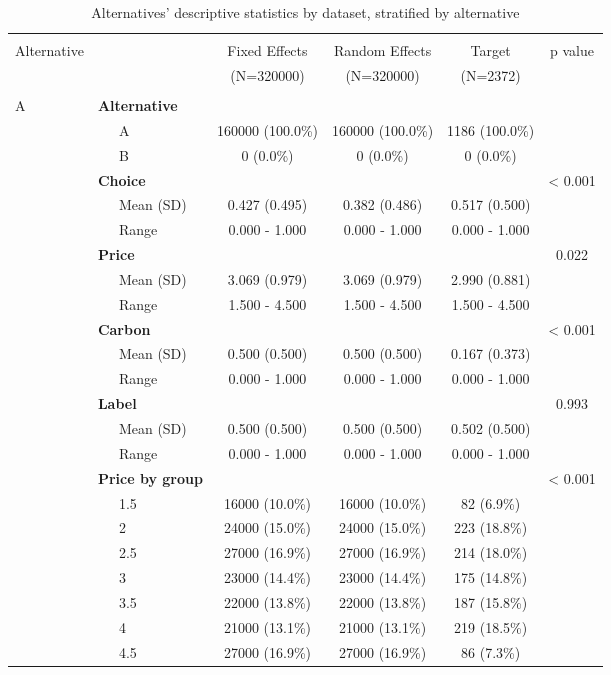 \documentclass[11pt,]{article}
\begin{document}
\begin{table}[!htbp] \centering 
  \caption{Alternatives' descriptive statistics by dataset, stratified by alternative} 
  \label{tab:stratA} 
\begin{tabular}{@{\extracolsep{5pt}}llcccc}
\\[-1.8ex]\hline 
\hline \\[-1.8ex] 
Alternative &  & Fixed Effects  & Random Effects  & Target  & p value\\
 & & (N=320000) & (N=320000) & (N=2372) &  \\
\hline \\[-1.8ex] 
A & \textbf{Alternative} &  &  &  & \\
 & ~~~A & 160000 (100.0\%) & 160000 (100.0\%) & 1186 (100.0\%) & \\
 & ~~~B & 0 (0.0\%) & 0 (0.0\%) & 0 (0.0\%) & \\
 & \textbf{Choice} &  &  &  & < 0.001\\
 & ~~~Mean (SD) & 0.427 (0.495) & 0.382 (0.486) & 0.517 (0.500) & \\
 & ~~~Range & 0.000 - 1.000 & 0.000 - 1.000 & 0.000 - 1.000 & \\
 & \textbf{Price} &  &  &  & 0.022\\
 & ~~~Mean (SD) & 3.069 (0.979) & 3.069 (0.979) & 2.990 (0.881) & \\
 & ~~~Range & 1.500 - 4.500 & 1.500 - 4.500 & 1.500 - 4.500 & \\
 & \textbf{Carbon} &  &  &  & < 0.001\\
 & ~~~Mean (SD) & 0.500 (0.500) & 0.500 (0.500) & 0.167 (0.373) & \\
 & ~~~Range & 0.000 - 1.000 & 0.000 - 1.000 & 0.000 - 1.000 & \\
 & \textbf{Label} &  &  &  & 0.993\\
 & ~~~Mean (SD) & 0.500 (0.500) & 0.500 (0.500) & 0.502 (0.500) & \\
 & ~~~Range & 0.000 - 1.000 & 0.000 - 1.000 & 0.000 - 1.000 & \\
 & \textbf{Price by group} &  &  &  & < 0.001\\
 & ~~~1.5 & 16000 (10.0\%) & 16000 (10.0\%) & 82 (6.9\%) & \\
 & ~~~2 & 24000 (15.0\%) & 24000 (15.0\%) & 223 (18.8\%) & \\
 & ~~~2.5 & 27000 (16.9\%) & 27000 (16.9\%) & 214 (18.0\%) & \\
 & ~~~3 & 23000 (14.4\%) & 23000 (14.4\%) & 175 (14.8\%) & \\
 & ~~~3.5 & 22000 (13.8\%) & 22000 (13.8\%) & 187 (15.8\%) & \\
 & ~~~4 & 21000 (13.1\%) & 21000 (13.1\%) & 219 (18.5\%) & \\
 & ~~~4.5 & 27000 (16.9\%) & 27000 (16.9\%) & 86 (7.3\%) & \\
\hline
\end{tabular}
\end{table}
\end{document}
